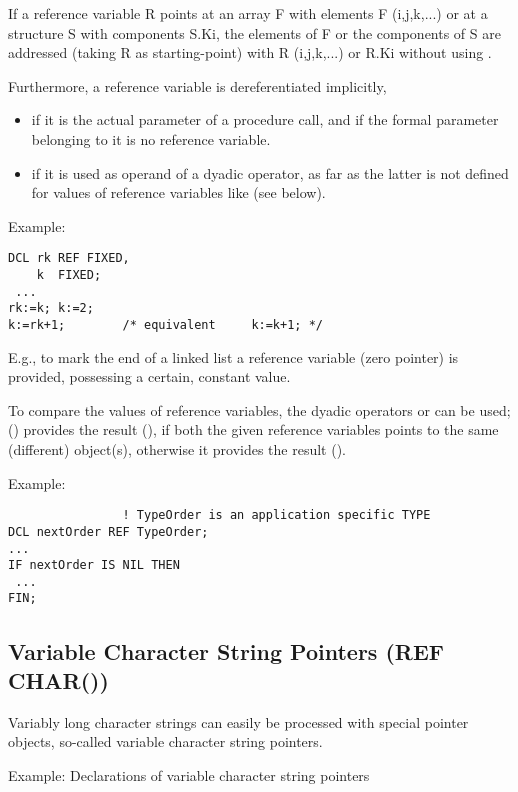 If a reference variable R points at an array F with elements F
(i,j,k,...) or at a structure S with components S.Ki, the elements of F
or the components of S are addressed (taking R as starting-point) with R
(i,j,k,...) or R.Ki without using .

Furthermore, a reference variable is dereferentiated implicitly,
\begin{itemize}
\item if it is the actual parameter of a procedure call, and if the
formal parameter belonging to it is no reference variable.
\item if it is used as operand of a dyadic operator, as far as the
latter is not defined for values of reference variables like  (see
below).
\end{itemize}

Example:

\begin{lstlisting}
DCL rk REF FIXED,
    k  FIXED;
 ...
rk:=k; k:=2;
k:=rk+1;        /* equivalent     k:=k+1; */
\end{lstlisting}

E.g., to mark the end of a %
linked list a reference variable  (zero
pointer) is provided, possessing a certain, constant value.

To compare the values of reference variables, the dyadic operators 
 or
 can be used;  () provides the result
  (), if both the
given reference variables points to the same (different) object(s),
otherwise it provides the result  ().

Example:

\begin{lstlisting}
                ! TypeOrder is an application specific TYPE
DCL nextOrder REF TypeOrder;
...
IF nextOrder IS NIL THEN
 ...
FIN;
\end{lstlisting}

\subsection{Variable Character String Pointers (REF CHAR())}  %
\label{sec_ref_char}

Variably long character strings can easily be processed with special
pointer objects, so-called variable character string pointers.

Example: Declarations of variable character string pointers

